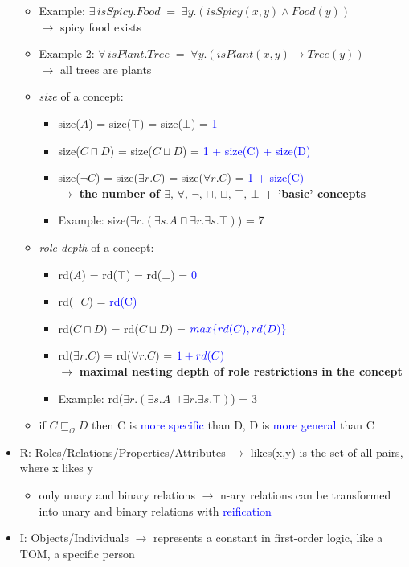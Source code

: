 \documentclass[12pt,a4paper]{article}
\newcommand{\blue}[1]{\textcolor{blue} {#1}}
\newcommand{\ra}{$\rightarrow$ }
\newcommand{\ont}{\mathcal{O}}
\newcommand{\sse}{\sqsubseteq}
\begin{document}
\begin{itemize}
\begin{itemize}
\item Example: $\exists \,isSpicy.Food \;=\; \exists y.(isSpicy(x,y) \land Food(y))$\\\ra spicy food exists
\item Example 2: $\forall \,isPlant.Tree \;=\; \forall y.(isPlant(x,y) \rightarrow Tree(y))$\\\ra all trees are plants
\item \textit{size} of a concept:
\begin{itemize}
\item size($A$) = size($\top$) = size($\bot$) = \blue{1}
\item size($C\sqcap D$) = size($C\sqcup D$) = \blue{1 + size(C) + size(D)}
\item size($\neg C$) = size($\exists r.C$) = size($\forall r.C$) = \blue{1 + size(C)}\\\ra \textbf{the number of $\exists,\,\forall,\,\neg,\,\sqcap,\,\sqcup,\,\top,\,\bot$ + 'basic' concepts}
\item Example: size($\exists r.(\exists s.A\sqcap \exists r.\exists s.\top)$) = 7
\end{itemize}
\item \textit{role depth} of a concept:

\begin{itemize}
\item rd($A$) = rd($\top$) = rd($\bot$) = \blue{0}
\item rd($\neg C$) = \blue{rd(C)}
\item rd($C\sqcap D$) = rd($C\sqcup D$) = $\blue{max\{rd(C),rd(D)\}}$
\item rd($\exists r.C$) = rd($\forall r.C$) = $\blue{1+rd(C)}$\\\ra \textbf{maximal nesting depth of role restrictions in the concept}
\item Example: rd($\exists r. (\exists s.A\sqcap \exists r.\exists s.\top)$) = 3
\end{itemize}
\item if $C \sse_\ont D$ then C is \blue{more specific} than D, D is \blue{more general} than C

\end{itemize}
\item R: Roles/Relations/Properties/Attributes \ra likes(x,y) is the set of all pairs, where x likes y
\begin{itemize}
\item only unary and binary relations \ra n-ary relations can be transformed into unary and binary relations with \blue{reification}
\end{itemize}
\item I: Objects/Individuals \ra represents a constant in first-order logic, like a TOM, a specific person
\end{itemize}
\flushleft
\end{document}
